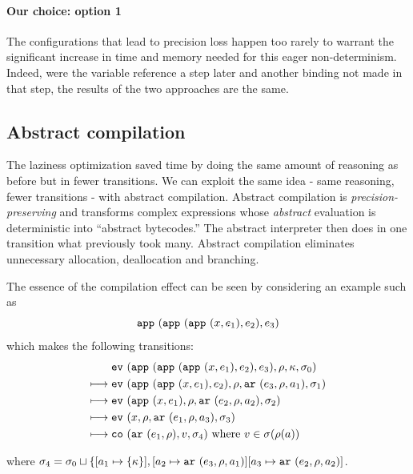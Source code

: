 \documentclass[preprint,onecolumn,9pt]{sigplanconf} %
\begin{document}
\paragraph{Our choice: option 1}
The configurations that lead to precision loss happen too rarely to
warrant the significant increase in time and memory needed for this
eager non-determinism. Indeed, were the variable reference a step
later and another binding not made in that step, the results of the
two approaches are the same.


\subsection{Abstract compilation}

The laziness optimization saved time by doing the same amount of
reasoning as before but in fewer transitions. We can exploit the same
idea - same reasoning, fewer transitions - with abstract
compilation. Abstract compilation is \emph{precision-preserving} and
transforms complex expressions whose \emph{abstract} evaluation is
deterministic into ``abstract bytecodes.''  The abstract interpreter
then does in one transition what previously took many. Abstract
compilation eliminates unnecessary allocation, deallocation and
branching.

The essence of the compilation effect can be seen by considering an
example such as
\[
{\tt app{\ }}({{\tt app{\ }}({{\tt app{\ }}({x,e_1}),e_2}),e_3})
\]
which makes the following transitions:
\begin{align}
& \ev{\sapp{\sapp{\sapp\mvar{\mexp_1}}{\mexp_2}}{\mexp_3},\menv,\mkont,\msto_0}\\
\machstep\; &
\ev{\sapp{\sapp\mvar{\mexp_1}}{\mexp_2},\menv,\kar{\mexp_3,\menv,\maddr_1},\msto_1}
\\
\machstep\; &
\ev{\sapp\mvar{\mexp_1},\menv,\kar{\mexp_2,\menv,\maddr_2},\msto_2}
\\
\machstep\; &
\ev{\mvar, \menv,\kar{\mexp_1,\menv,\maddr_3},\msto_3} %
\\
\machstep\; &
\co{\kar{\mexp_1,\menv},\mval,\msto_4} %
\mbox{ where } \mval \in \msto(\menv(\maddr))
\end{align}

where $\sigma_4 = \sigma_0 \sqcup \{ [a_1 \mapsto \{ \kappa \}],
[a_2 \mapsto {\tt ar{\ }}({e_3,\rho,a_1})]
[a_3 \mapsto {\tt ar{\ }}({e_2,\rho,a_2})]$.
\end{document}
